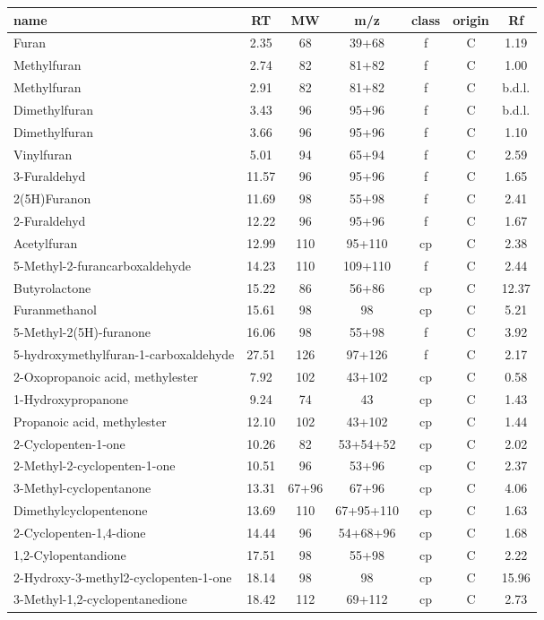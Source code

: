 

\newpage
\begin{table*}[p]
\begin{center}
\begin{tabular}{lcccccc}
name & RT & MW & m/z & class\footnotemark[1] & origin\footnotemark[2]&Rf\footnotemark[3]\\
\hline
Furan&2.35&68&39+68&f&C&1.19\\
Methylfuran&2.74&82&81+82&f&C&1.00\\
Methylfuran&2.91&82&81+82&f&C&b.d.l.\\
Dimethylfuran&3.43&96&95+96&f&C&b.d.l.\\
Dimethylfuran&3.66&96&95+96&f&C&1.10\\
Vinylfuran&5.01&94&65+94&f&C&2.59\\
3-Furaldehyd&11.57&96&95+96&f&C&1.65\\
2(5H)Furanon&11.69&98&55+98&f&C&2.41\\
2-Furaldehyd&12.22&96&95+96&f&C&1.67\\
Acetylfuran&12.99&110&95+110&cp&C&2.38\\
5-Methyl-2-furancarboxaldehyde&14.23&110&109+110&f&C&2.44\\
Butyrolactone&15.22&86&56+86&cp&C&12.37\\
Furanmethanol&15.61&98&98&cp&C&5.21\\
5-Methyl-2(5H)-furanone&16.06&98&55+98&f&C&3.92\\
5-hydroxymethylfuran-1-carboxaldehyde&27.51&126&97+126&f&C&2.17\\
2-Oxopropanoic acid, methylester&7.92&102&43+102&cp&C&0.58\\
1-Hydroxypropanone&9.24&74&43&cp&C&1.43\\
Propanoic acid, methylester&12.10&102&43+102&cp&C&1.44\\
2-Cyclopenten-1-one&10.26&82&53+54+52&cp&C&2.02\\
2-Methyl-2-cyclopenten-1-one&10.51&96&53+96&cp&C&2.37\\
3-Methyl-cyclopentanone&13.31&67+96&67+96&cp&C&4.06\\
Dimethylcyclopentenone&13.69&110&67+95+110&cp&C&1.63\\
2-Cyclopenten-1,4-dione&14.44&96&54+68+96&cp&C&1.68\\
1,2-Cylopentandione&17.51&98&55+98&cp&C&2.22\\
2-Hydroxy-3-methyl2-cyclopenten-1-one&18.14&98&98&cp&C&15.96\\
3-Methyl-1,2-cyclopentanedione&18.42&112&69+112&cp&C&2.73\\

\end{tabular}
\end{center}
\end{table*}
